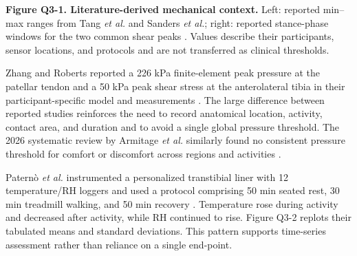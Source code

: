 \vspace{0.3em}
{\fontsize{8.25}{9.6}\selectfont\color{AUBGray}
\textbf{Figure Q3-1. Literature-derived mechanical context.} Left: reported
min--max ranges from Tang \textit{et al.} and Sanders \textit{et al.}; right:
reported stance-phase windows for the two common shear peaks
\cite{q3sanders1992,q3tang2022}. Values describe their participants, sensor
locations, and protocols and are not transferred as clinical thresholds.\par}

\vspace{0.6em}
{\fontsize{9.4}{11.1}\selectfont
Zhang and Roberts reported a 226 kPa finite-element peak pressure at the
patellar tendon and a 50 kPa peak shear stress at the anterolateral tibia in
their participant-specific model and measurements \cite{q3zhang2001}. The
large difference between reported studies reinforces the need to record
anatomical location, activity, contact area, and duration and to avoid a single
global pressure threshold. The 2026 systematic review by Armitage
\textit{et al.} similarly found no consistent pressure threshold for comfort or
discomfort across regions and activities \cite{q3armitage2026}.\par}

\clearpage
{}

\hypertarget{q3-microclimate-evidence}{}

{\fontsize{9.5}{11.25}\selectfont
Patern\`o \textit{et al.} instrumented a personalized transtibial liner with
12 temperature/RH loggers and used a protocol comprising 50 min seated rest,
30 min treadmill walking, and 50 min recovery \cite{paterno2020}. Temperature
rose during activity and decreased after activity, while RH continued to rise.
Figure Q3-2 replots their tabulated means and standard deviations. This pattern
supports time-series assessment rather than reliance on a single end-point.\par}

